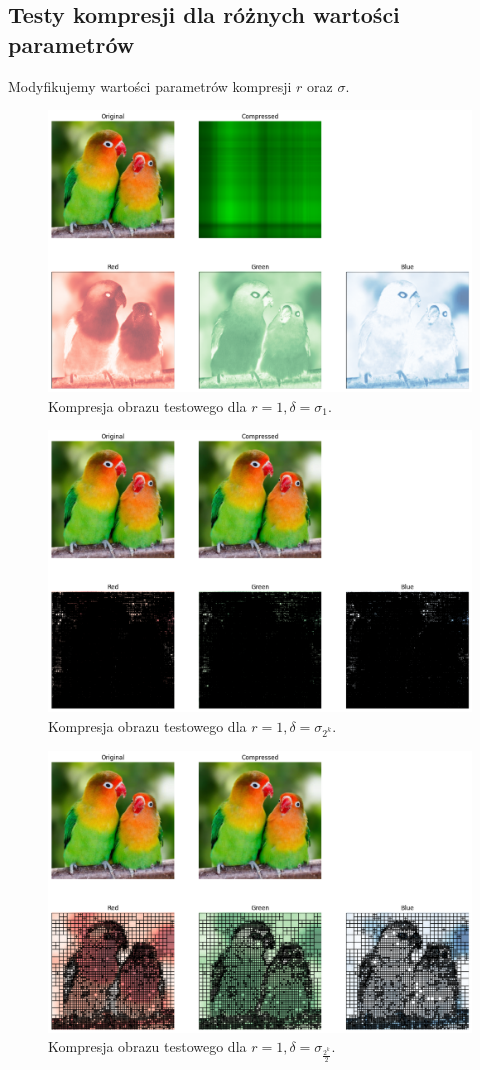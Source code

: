 \documentclass[11pt, leqno]{scrartcl}
\begin{document}
    \subsection{Testy kompresji dla różnych wartości parametrów}
    Modyfikujemy wartości parametrów kompresji $r$ oraz $\sigma$.
    \begin{figure}[H]
        \centering
        \includegraphics[width=0.9\linewidth]{r1sigma1.png}
        \caption{Kompresja obrazu testowego dla $r=1,\delta =\sigma_1$.}
    \end{figure}
    \begin{figure}[H]
        \centering
        \includegraphics[width=0.9\linewidth]{r1sigma2k.png}
        \caption{Kompresja obrazu testowego dla $r=1,\delta =\sigma_{2^k}$.}
    \end{figure}
    \begin{figure}[H]
        \centering
        \includegraphics[width=0.9\linewidth]{r1sigma05k.png}
        \caption{Kompresja obrazu testowego dla $r=1,\delta =\sigma_\frac{2^k}{2}$.}
    \end{figure}
\end{document}
